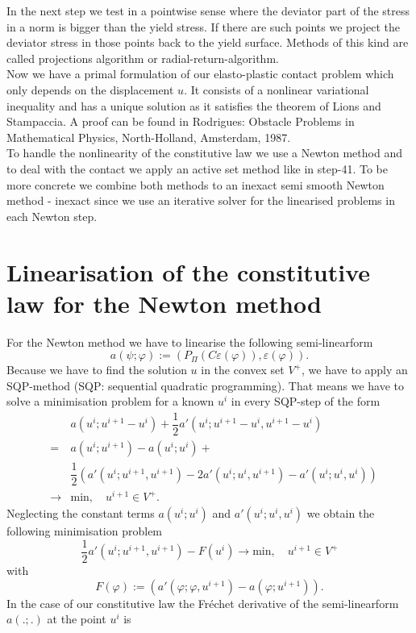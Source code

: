 \documentclass{article}
\begin{document}
In the next step we test in a pointwise sense where the deviator part of the
stress in a norm is bigger than the yield stress. If there are such points we
project the deviator stress in those points back to the yield surface. Methods of this kind are called projections algorithm or radial-return-algorithm.\\
Now we have a primal formulation of our elasto-plastic contact problem which only depends on the displacement $u$.
It consists of a nonlinear variational inequality and has a unique solution as
it satisfies the theorem of Lions and Stampaccia. A proof can be found in
Rodrigues: Obstacle Problems in Mathematical Physics, North-Holland, Amsterdam,
1987.\\
To handle the nonlinearity of the constitutive law we use a Newton method and to deal with the contact we apply an
active set method like in step-41. To be more concrete we combine both methods to an inexact semi smooth Newton
method - inexact since we use an iterative solver for the linearised problems in each Newton step.

\section{Linearisation of the constitutive law for the Newton method}

For the Newton method we have to linearise the following semi-linearform
$$a(\psi;\varphi) := \left(P_{\Pi}(C\varepsilon(\varphi)),\varepsilon(\varphi)\right).$$
Because we have to find the solution $u$ in the convex set $V^+$, we have to
apply an SQP-method (SQP: sequential quadratic programming). That means we have
to solve a minimisation problem for a known $u^i$ in every SQP-step of the form
\begin{eqnarray*}
 & & a(u^{i};u^{i+1} - u^i) + \dfrac{1}{2}a'(u^i;u^{i+1} - u^i,u^{i+1} - u^i)\\
 &=&  a(u^i;u^{i+1}) -  a(u^i;u^i) +\\
 & & \dfrac{1}{2}\left( a'(u^i;u^{i+1},u^{i+1}) - 2a'(u^i;u^i,u^{i+1}) - a'(u^i;u^i,u^i)\right)\\
 &\rightarrow& \textrm{min},\quad u^{i+1}\in V^+.
\end{eqnarray*}
Neglecting the constant terms $ a(u^i;u^i)$ and $ a'(u^i;u^i,u^i)$ we obtain the
following minimisation problem $$\dfrac{1}{2} a'(u^i;u^{i+1},u^{i+1}) - F(u^i)\rightarrow \textrm{min},\quad u^{i+1}\in V^+$$ with
$$F(\varphi) := \left(a'(\varphi;\varphi,u^{i+1}) -  a(\varphi;u^{i+1}) \right).$$
In the case of our constitutive law the Fr\'echet derivative of the
semi-linearform $a(.;.)$ at the point $u^i$ is
\end{document}
